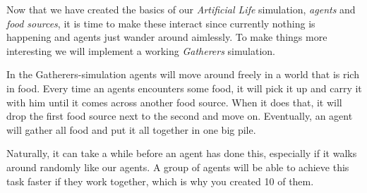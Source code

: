 Now that we have created the basics of our \textit{Artificial Life} simulation, \textit{agents} and \textit{food sources}, it is time to make these interact since currently nothing is happening and agents just wander around aimlessly. To make things more interesting we will  implement a working \textit{Gatherers} simulation. 

In the Gatherers-simulation agents will move around freely in a world that is rich in food. Every time an agents encounters some food, it will pick it up and carry it with him until it comes across another food source. When it does that, it will drop the first food source next to the second and move on. Eventually, an agent will gather all food and put it all together in one big pile. 

Naturally, it can take a while before an agent has done this, especially if it walks around randomly like our agents. A group of agents will be able to achieve this task faster if they work together, which is why you created 10 of them.

